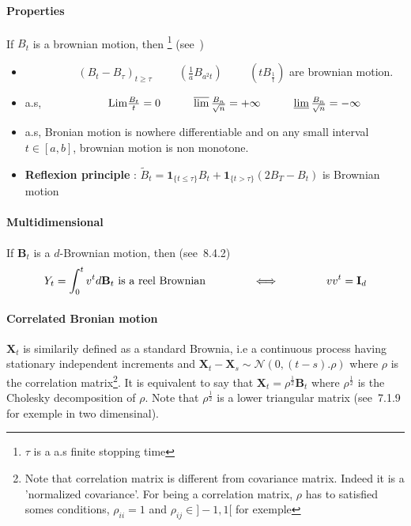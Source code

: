 \documentclass[a4paper,10pt]{article}
\begin{document}
\paragraph{Properties}
If $B_t$ is a brownian motion, then \footnote{$\tau$ is a a.s finite stopping time} (see~\cite{PETER})
\begin{itemize}
 \item $\hspace{2cm} (B_t-B_{\tau})_{t\geq \tau} \hspace{1cm}  (\frac{1}{a}B_{a^2 t}) \hspace{1cm}  (tB_{\frac{1}{t}})$ are brownian motion.
 \item a.s, $\hspace{2cm} \text{Lim}\frac{B_t}{t} = 0   \hspace{1cm} \varlimsup\frac{B_n}{\sqrt{n}}=+\infty \hspace{1cm} \varliminf\frac{B_n}{\sqrt{n}}=-\infty$
 \item a.s, Bronian motion is nowhere differentiable and on any small interval $t\in[a,b]$, brownian motion is non monotone.
 \item \textbf{Reflexion principle} : $\tilde{B}_t = \mathbf{1}_{\{t\leq \tau\}} B_t + \mathbf{1}_{\{t>\tau\}} (2B_T - B_t) $ is Brownian motion  
\end{itemize}
\paragraph{Multidimensional}
If $\textbf{B}_t$ is a $d$-Brownian motion, then (see~\cite{OKSENDAL}8.4.2)
\[
Y_t = \int_0^t v^t d\textbf{B}_t \text{ is a reel Brownian} 
\hspace{1.5cm} \Longleftrightarrow \hspace{1.5cm}
vv^t = \textbf{I}_d
\]
\paragraph{Correlated Bronian motion } $\textbf{X}_t$ is similarily defined as a standard Brownia, i.e a continuous process having stationary independent increments and $\textbf{X}_t - \textbf{X}_s \sim \mathcal{N}(0,(t-s).\rho)$ where $\rho$ is the correlation matrix\footnote{Note that correlation matrix is different from covariance matrix. Indeed it is a 'normalized covariance'. For being a correlation matrix, $\rho$ has to satisfied somes conditions, $\rho_{ii}=1$ and $\rho_{ij} \in ]-1,1[$ for exemple}. It is equivalent to say that $\textbf{X}_t = \rho^{\frac{1}{2}} \textbf{B}_t$ where $\rho^{\frac{1}{2}}$ is the Cholesky decomposition of $\rho$. Note that $\rho^{\frac{1}{2}}$ is a lower triangular matrix (see~\cite{MAREK}7.1.9 for exemple in two dimensinal).
\end{document}
